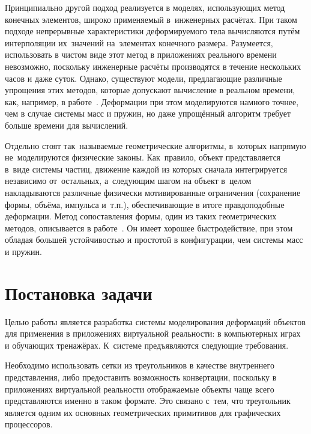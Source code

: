 \documentclass[a4paper, 14pt, titlepage]{extarticle}
\let\oldsection\section
\renewcommand{\section}{\newpage\oldsection}
\begin{document}
    Принципиально другой подход реализуется в моделях, использующих метод конечных элементов, широко
    применяемый в~инженерных расчётах. При таком подходе
    непрерывные характеристики деформируемого тела вычисляются путём интерполяции их~значений
    на~элементах конечного размера. Разумеется, использовать в чистом виде этот метод
    в приложениях реального времени невозможно, поскольку инженерные расчёты производятся в
    течение нескольких часов и даже суток. Однако, существуют модели, предлагающие различные упрощения этих
    методов, которые допускают вычисление в реальном времени, как, например, в работе~\cite{mueller-stable}.
    Деформации при этом моделируются намного точнее, чем в случае системы масс и пружин, но даже
    упрощённый алгоритм требует больше времени для вычислений. %

    Отдельно стоят так~называемые геометрические алгоритмы, в~которых напрямую не~моделируются
    физические законы. Как~правило, объект представляется в~виде системы частиц, движение каждой из
    которых сначала интегрируется независимо от~остальных, а~следующим шагом на объект в~целом
    накладываются различные физически мотивированные ограничения (сохранение формы, объёма, импульса
    и~т.п.), обеспечивающие в итоге правдоподобные деформации. Метод сопоставления формы, один из
    таких геометрических методов, описывается в работе~\cite{mueller-meshless}. Он имеет хорошее быстродействие,
    при этом обладая большей устойчивостью и простотой в конфигурации, чем системы масс и пружин.

  \section{Постановка задачи}\label{sec:task}

    Целью работы является разработка системы моделирования деформаций объектов для применения в
    приложениях виртуальной реальности: в компьютерных играх и обучающих тренажёрах.
    К~системе предъявляются следующие требования.

    Необходимо использовать сетки из треугольников в качестве внутреннего представления, либо
    предоставить возможность конвертации, поскольку в приложениях виртуальной реальности отображаемые объекты
    чаще всего представляются именно в таком формате. Это связано с~тем, что треугольник является
    одним их основных геометрических примитивов для графических процессоров.~\cite{nvidia-tutorial}
\end{document}
